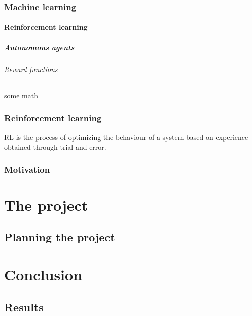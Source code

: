 \documentclass[UKenglish]{ifimaster}  %
\begin{document}
\section{Machine learning}
\subsection{Reinforcement learning}
\subsubsection{Autonomous agents}
\paragraph{Reward functions}
\subparagraph{some math}

\section{Reinforcement learning}
RL is the process of optimizing the behaviour of a system based on experience obtained through trial and error. \cite{boka jeg fikk av kai}
\section{Motivation}

\part{The project}                    %

\chapter{Planning the project}        %


\part{Conclusion}                     %

\chapter{Results}                     %


\backmatter{}
\printbibliography
\end{document}
